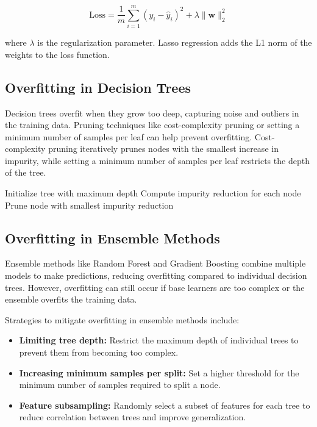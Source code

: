 \documentclass[12pt]{book} %
\begin{document}
\[
\text{Loss} = \frac{1}{m} \sum_{i=1}^{m} (y_i - \hat{y}_i)^2 + \lambda \| \mathbf{w} \|_2^2
\]

where \( \lambda \) is the regularization parameter. Lasso regression adds the L1 norm of the weights to the loss function.

\subsection{Overfitting in Decision Trees}

Decision trees overfit when they grow too deep, capturing noise and outliers in the training data. Pruning techniques like cost-complexity pruning or setting a minimum number of samples per leaf can help prevent overfitting. Cost-complexity pruning iteratively prunes nodes with the smallest increase in impurity, while setting a minimum number of samples per leaf restricts the depth of the tree.

\begin{algorithm}
\caption{Cost-Complexity Pruning}
\begin{algorithmic}[1]
\State Initialize tree with maximum depth
    \State Compute impurity reduction for each node
    \State Prune node with smallest impurity reduction
\EndWhile
\end{algorithmic}
\end{algorithm}

\subsection{Overfitting in Ensemble Methods}

Ensemble methods like Random Forest and Gradient Boosting combine multiple models to make predictions, reducing overfitting compared to individual decision trees. However, overfitting can still occur if base learners are too complex or the ensemble overfits the training data.

Strategies to mitigate overfitting in ensemble methods include:

\begin{itemize}
    \item \textbf{Limiting tree depth:} Restrict the maximum depth of individual trees to prevent them from becoming too complex.
    \item \textbf{Increasing minimum samples per split:} Set a higher threshold for the minimum number of samples required to split a node.
    \item \textbf{Feature subsampling:} Randomly select a subset of features for each tree to reduce correlation between trees and improve generalization.
\end{itemize}
\end{document}
